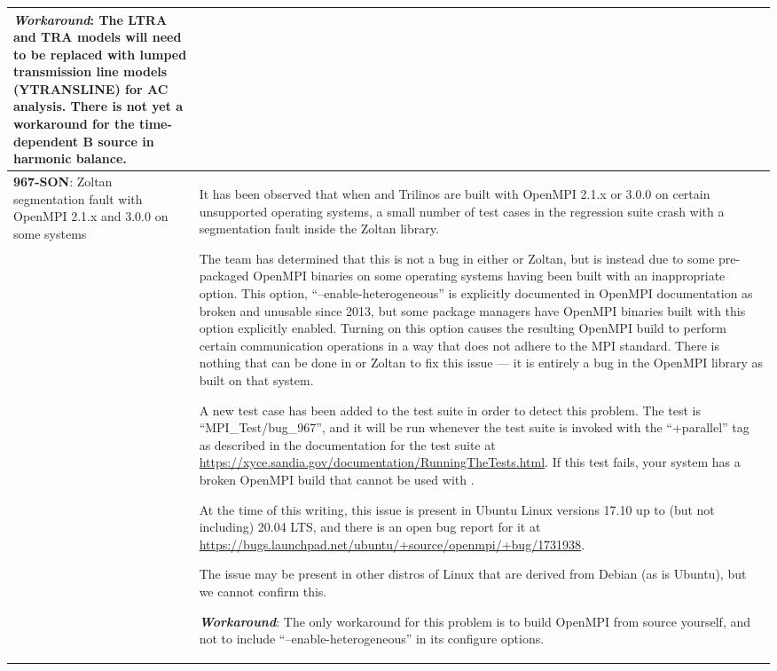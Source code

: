 {\begin{longtable}[h] {>{\raggedright\small}m{2in}|>{\raggedright\let\\\tabularnewline\small}m{3.5in}}
\textbf{\textit{Workaround}}: The LTRA and TRA models will need to be replaced
with lumped transmission line models (YTRANSLINE) for AC analysis.
There is not yet a workaround for the time-dependent B source in
harmonic balance.
\\ \hline

\textbf{967-SON}: Zoltan segmentation fault with OpenMPI 2.1.x and 3.0.0 on
some systems &

It has been observed that when \Xyce{} and Trilinos are built with
OpenMPI 2.1.x or 3.0.0 on certain unsupported operating systems, a
small number of test cases in the regression suite crash with a
segmentation fault inside the Zoltan library.

The \Xyce{} team has determined that this is not a bug in
either \Xyce{} or Zoltan, but is instead due to some pre-packaged OpenMPI
binaries on some operating systems having been built with an
inappropriate option.  This option, ``--enable-heterogeneous'' is
explicitly documented in OpenMPI documentation as broken and unusable
since 2013, but some package managers have OpenMPI binaries built with
this option explicitly enabled.  Turning on this option causes the
resulting OpenMPI build to perform certain communication operations in
a way that does not adhere to the MPI standard.  There is nothing that
can be done in \Xyce{} or Zoltan to fix this issue --- it is entirely
a bug in the OpenMPI library as built on that system.

A new test case has been added to the \Xyce{} test suite in order to
detect this problem.  The test is ``MPI\_Test/bug\_967'', and it will
be run whenever the test suite is invoked with the ``+parallel'' tag
as described in the documentation for the test suite
at \url{https://xyce.sandia.gov/documentation/RunningTheTests.html}.
If this test fails, your system has a broken OpenMPI build that cannot
be used with \Xyce{}.

At the time of this writing, this issue is present in Ubuntu Linux
versions 17.10 up to (but not including) 20.04 LTS, and there is an
open bug report for it
at \url{https://bugs.launchpad.net/ubuntu/+source/openmpi/+bug/1731938}.

The issue may be present in other distros of Linux that are derived
from Debian (as is Ubuntu), but we cannot confirm this.

\textbf{\textit{Workaround}}:
The only workaround for this problem is to build OpenMPI from source
yourself, and not to include ``--enable-heterogeneous'' in its
configure options.


\end{longtable}}
